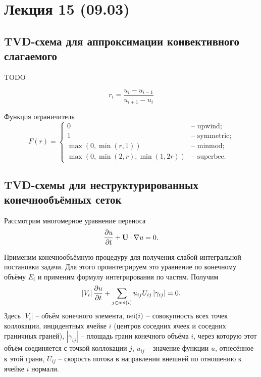 \section{Лекция 15 (09.03)}

\subsection{TVD-схема для аппроксимации конвективного слагаемого}
TODO

\begin{equation}
\label{eq:tvd_ri}
r_i = \frac{u_i - u_{i-1}}{u_{i+1} - u_{i}}
\end{equation}

Функция ограничитель
\begin{equation}
\label{eq:tvd_limiter}
F(r) = \left\{
\begin{array}{ll}
0                                   & \text{-- upwind};\\
1                                   & \text{-- symmetric}; \\
\max(0, \min(r, 1))                 & \text{-- minmod};\\
\max(0, \min(2, r), \min(1, 2 r))   & \text{-- superbee}.
\end{array}
\right.
\end{equation}

\subsection{TVD-схемы для неструктурированных конечнообъёмных сеток}
Рассмотрим многомерное уравнение переноса
\begin{equation}
\nonumber
\frac{\partial u}{\partial t} + \boldsymbol{\rm U} \cdot \nabla u = 0.
\end{equation}

Применим конечнообъёмную процедуру
для получения слабой интегральной постановки задачи.
Для этого проинтегрируем это уравнение
по конечному объёму $E_i$ 
и применим формулу интегрирования по частям.
Получим
\begin{equation}
\label{eq:tvd_fvm_transport}
\left| V_i \right|
\frac{\partial u}{\partial t}
+ \sum_{j\in {\rm nei}(i)} {u_{ij} U_{ij} \left|\gamma_{ij}\right|}
= 0.
\end{equation}
Здесь $|V_i|$ -- объём конечного элемента,
${\rm nei}(i)$ -- совокупность
всех точек коллокации, инцидентных ячейке $i$
(центров соседних ячеек и соседних граничных граней),
$|\gamma_{ij}|$ --
площадь грани
конечного объёма $i$, через
которую этот объём соединяется с точкой коллокации $j$,
$u_{ij}$ -- значение функции $u$, отнесённое к этой грани,
$U_{ij}$ -- скорость потока в направлении внешней по отношению
к ячейке $i$ нормали.

